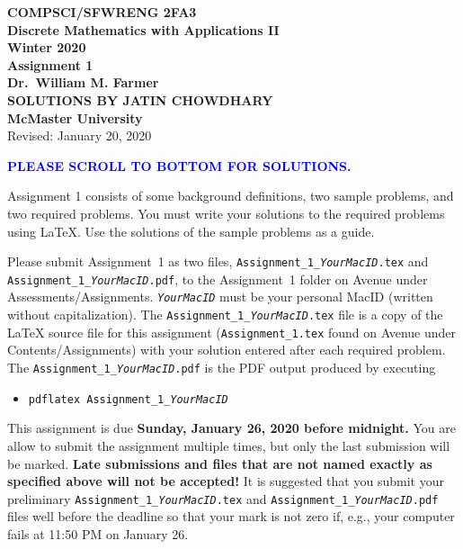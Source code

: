 \documentclass[11pt,fleqn]{article}
\begin{document}
\begin{center}

  {\large \textbf{COMPSCI/SFWRENG 2FA3}}\\[2mm]
  {\large \textbf{Discrete Mathematics with Applications II}}\\[2mm]
  {\large \textbf{Winter 2020}}\\[8mm]
  {\huge \textbf{Assignment 1}}\\[6mm]
  {\large \textbf{Dr.~William M. Farmer}}\\[2mm]
  {\large \textbf{SOLUTIONS BY JATIN CHOWDHARY}}\\[2mm]
  {\large \textbf{McMaster University}}\\[6mm]
  {\large Revised: January 20, 2020}

\end{center}

\medskip

\textcolor{blue}{\textbf{PLEASE SCROLL TO BOTTOM FOR SOLUTIONS.}}

\medskip

Assignment 1 consists of some background definitions, two sample
problems, and two required problems.  You must write your solutions to
the required problems using LaTeX.  Use the solutions of the sample
problems as a guide.

Please submit Assignment~1 as two files,
\texttt{Assignment\_1\_\emph{YourMacID}.tex} and
\texttt{Assignment\_1\_\emph{YourMacID}.pdf}, to the Assignment~1
folder on Avenue under Assessments/Assignments.
\texttt{\emph{YourMacID}} must be your personal MacID (written without
capitalization).  The \texttt{Assignment\_1\_\emph{YourMacID}.tex}
file is a copy of the LaTeX source file for this assignment
(\texttt{Assignment\_1.tex} found on Avenue under
Contents/Assignments) with your solution entered after each required
problem.  The \texttt{Assignment\_1\_\emph{YourMacID}.pdf} is the PDF
output produced by executing

\begin{itemize}

  \item[] \texttt{pdflatex Assignment\_1\_\emph{YourMacID}}

\end{itemize}

This assignment is due \textbf{Sunday, January 26, 2020 before
  midnight.}  You are allow to submit the assignment multiple times,
but only the last submission will be marked.  \textbf{Late submissions
  and files that are not named exactly as specified above will not be
  accepted!}  It is suggested that you submit your preliminary
\texttt{Assignment\_1\_\emph{YourMacID}.tex} and
\texttt{Assignment\_1\_\emph{YourMacID}.pdf} files well before the
deadline so that your mark is not zero if, e.g., your computer fails
at 11:50 PM on January 26.
\end{document}
